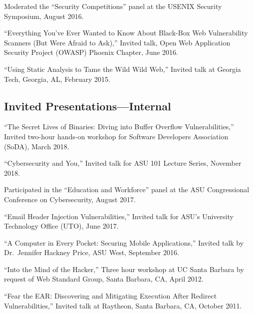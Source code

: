 \documentclass[11pt,letterpaper,sans]{moderncv}
\begin{document}
\begin{etaremune}
  \item Moderated the ``Security Competitions'' panel at the USENIX
    Security Symposium, August 2016.

  \item ``Everything You've Ever Wanted to Know About Black-Box Web
    Vulnerability Scanners (But Were Afraid to Ask),'' Invited talk,
    Open Web Application Security Project (OWASP) Phoenix Chapter,
    June 2016.

  \item ``Using Static Analysis to Tame the Wild Wild Web,'' Invited
    talk at Georgia Tech, Georgia, AL, February 2015.

\end{etaremune}

\subsection{Invited Presentations---Internal}

\begin{etaremune}

  \item ``The Secret Lives of Binaries: Diving into Buffer Overflow Vulnerabilities,'' Invited two-hour hands-on workshop for Software Developers
  Association (SoDA), March 2018.

  \item ``Cybersecurity and You,'' Invited talk for ASU 101 Lecture Series, November 2018.
  
  \item Participated in the ``Education and Workforce'' panel at the
    ASU Congressional Conference on Cybersecurity, August 2017.

  \item ``Email Header Injection Vulnerabilities,'' Invited talk for ASU's University Technology Office (UTO), June 2017.

  \item ``A Computer in Every Pocket: Securing Mobile Applications,''
    Invited talk by Dr.\ Jennifer Hackney Price, ASU West, September
    2016.

  \item ``Into the Mind of the Hacker,'' Three hour workshop at UC
    Santa Barbara by request of Web Standard Group, Santa Barbara, CA,
    April 2012.

  \item ``Fear the EAR: Discovering and Mitigating Execution After
    Redirect Vulnerabilities,'' Invited talk at Raytheon, Santa
    Barbara, CA, October 2011.

\end{etaremune}
\end{document}
